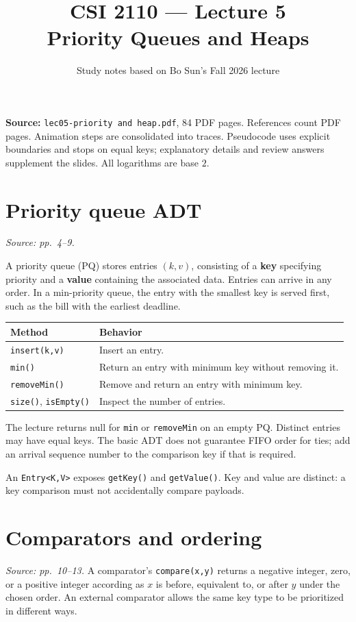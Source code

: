 \documentclass[11pt]{article}
\title{CSI 2110 --- Lecture 5\\Priority Queues and Heaps}
\author{Study notes based on Bo Sun's Fall 2026 lecture}
\date{}
\begin{document}
\maketitle
\textbf{Source:} \texttt{lec05-priority and heap.pdf}, 84 PDF pages. References count PDF pages. Animation steps are consolidated into traces. Pseudocode uses explicit boundaries and stops on equal keys; explanatory details and review answers supplement the slides. All logarithms are base $2$.

\section{Priority queue ADT}
\textit{Source: pp.\ 4--9.}

A priority queue (PQ) stores entries $(k,v)$, consisting of a \textbf{key} specifying priority and a \textbf{value} containing the associated data. Entries can arrive in any order. In a min-priority queue, the entry with the smallest key is served first, such as the bill with the earliest deadline.

\begin{center}
\begin{tabularx}{\textwidth}{lX}
\toprule
Method & Behavior\\
\midrule
\texttt{insert(k,v)} & Insert an entry.\\
\texttt{min()} & Return an entry with minimum key without removing it.\\
\texttt{removeMin()} & Remove and return an entry with minimum key.\\
\texttt{size()}, \texttt{isEmpty()} & Inspect the number of entries.\\
\bottomrule
\end{tabularx}
\end{center}
The lecture returns null for \texttt{min} or \texttt{removeMin} on an empty PQ. Distinct entries may have equal keys. The basic ADT does not guarantee FIFO order for ties; add an arrival sequence number to the comparison key if that is required.

An \texttt{Entry<K,V>} exposes \texttt{getKey()} and \texttt{getValue()}. Key and value are distinct: a key comparison must not accidentally compare payloads.

\section{Comparators and ordering}
\textit{Source: pp.\ 10--13.}
A comparator's \texttt{compare(x,y)} returns a negative integer, zero, or a positive integer according as $x$ is before, equivalent to, or after $y$ under the chosen order. An external comparator allows the same key type to be prioritized in different ways.
\end{document}
